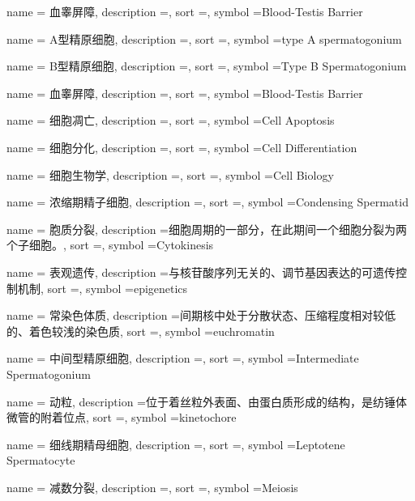 {
	name = {血睾屏障},
	description ={},
	sort ={},
	symbol ={Blood-Testis Barrier}
}

{
	name = {A型精原细胞},
	description ={},
	sort ={},
	symbol ={type A spermatogonium}
}

{
	name = {B型精原细胞},
	description ={},
	sort ={},
	symbol ={Type B Spermatogonium}
}

{
	name = {血睾屏障},
	description ={},
	sort ={},
	symbol ={Blood-Testis Barrier}
}

{
	name = {细胞凋亡},
	description ={},
	sort ={},
	symbol ={Cell Apoptosis}
}

{
	name = {细胞分化},
	description ={},
	sort ={},
	symbol ={Cell Differentiation}
}

{
	name = {细胞生物学},
	description ={},
	sort ={},
	symbol ={Cell Biology}
}

{
	name = {浓缩期精子细胞},
	description ={},
	sort ={},
	symbol ={Condensing Spermatid}
}

{
	name = {胞质分裂},
	description ={细胞周期的一部分，在此期间一个细胞分裂为两个子细胞。},
	sort ={},
	symbol ={Cytokinesis}
}

{
	name = {表观遗传},
	description ={与核苷酸序列无关的、调节基因表达的可遗传控制机制},
	sort ={},
	symbol ={epigenetics}
}

{
	name = {常染色体质},
	description ={间期核中处于分散状态、压缩程度相对较低的、着色较浅的染色质},
	sort ={},
	symbol ={euchromatin}
}

{
	name = {中间型精原细胞},
	description ={},
	sort ={},
	symbol ={Intermediate Spermatogonium}
}

{
	name = {动粒},
	description ={位于着丝粒外表面、由蛋白质形成的结构，是纺锤体微管的附着位点},
	sort ={},
	symbol ={kinetochore}
}

{
	name = {细线期精母细胞},
	description ={},
	sort ={},
	symbol ={Leptotene Spermatocyte}
}

{
	name = {减数分裂},
	description ={},
	sort ={},
	symbol ={Meiosis}
}

